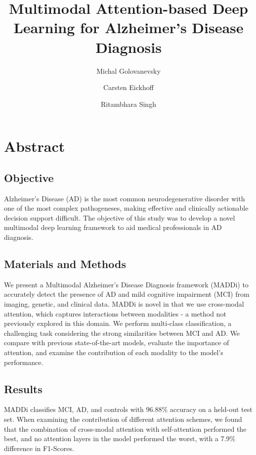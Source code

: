 \documentclass[11pt]{article}
\begin{document}
\author[1]{Michal Golovanevsky}
\author[1,2,*]{Carsten Eickhoff}
\author[1,3,*]{Ritambhara Singh}


\date{\vspace{-1.6cm}}

\title{Multimodal Attention-based Deep Learning for Alzheimer's Disease Diagnosis}

\noindent


\section*{Abstract}

\subsection*{Objective}
Alzheimer's Disease (AD) is the most common neurodegenerative disorder with one of the most complex pathogeneses, making effective and clinically actionable decision support difficult. The objective of this study was to develop a novel multimodal deep learning framework to aid medical professionals in AD diagnosis.


\subsection*{Materials and Methods}
We present a Multimodal Alzheimer's Disease Diagnosis framework (MADDi) to accurately detect the presence of AD and mild cognitive impairment (MCI) from imaging, genetic, and clinical data. MADDi is novel in that we use cross-modal attention, which captures interactions between modalities - a method not previously explored in this domain. We perform multi-class classification, a challenging task considering the strong similarities between MCI and AD. We compare with previous state-of-the-art models, evaluate the importance of attention, and examine the contribution of each modality to the model's performance.

\subsection*{Results}
MADDi classifies MCI, AD, and controls with 96.88\% accuracy on a held-out test set. When examining the contribution of different attention schemes, we found that the combination of cross-modal attention with self-attention performed the best, and no attention layers in the model performed the worst, with a 7.9\% difference in F1-Scores. 
\end{document}
